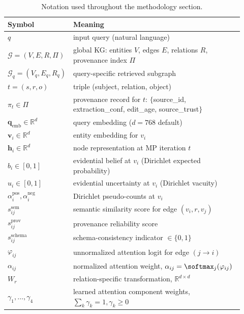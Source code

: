 
\begin{table}[t]
\centering
\caption{Notation used throughout the methodology section.}
\label{tab:notation}
\small
\begin{tabular}{@{}p{0.18\linewidth}p{0.74\linewidth}@{}}
\toprule
\textbf{Symbol} & \textbf{Meaning} \\
\midrule
$q$                 & input query (natural language) \\
$\mathcal{G}=(V,E,R,\Pi)$ & global KG: entities $V$, edges $E$, relations $R$, provenance index $\Pi$ \\
$\mathcal{G}_q=(V_q,E_q,R_q)$ & query-specific retrieved subgraph \\
$t = (s,r,o)$       & triple (subject, relation, object) \\
$\pi_t \in \Pi$     & provenance record for $t$: $\{$source\_id, extraction\_conf, edit\_age, source\_trust$\}$ \\
$\mathbf{q}_{\text{emb}} \in \mathbb{R}^d$ & query embedding ($d=768$ default) \\
$\mathbf{v}_i \in \mathbb{R}^d$    & entity embedding for $v_i$ \\
$\mathbf{h}_i \in \mathbb{R}^d$    & node representation at MP iteration $t$ \\
$b_i \in [0,1]$     & evidential belief at $v_i$ (Dirichlet expected probability) \\
$u_i \in [0,1]$     & evidential uncertainty at $v_i$ (Dirichlet vacuity) \\
$\alpha_i^{\text{pos}}, \alpha_i^{\text{neg}}$ & Dirichlet pseudo-counts at $v_i$ \\
$s^{\text{sem}}_{ij}$    & semantic similarity score for edge $(v_i, r, v_j)$ \\
$s^{\text{prov}}_{ij}$   & provenance reliability score \\
$s^{\text{schema}}_{ij}$ & schema-consistency indicator $\in \{0,1\}$ \\
$\varphi_{ij}$      & unnormalized attention logit for edge $(j{\rightarrow}i)$ \\
$\alpha_{ij}$       & normalized attention weight, $\alpha_{ij}=\softmax_j(\varphi_{ij})$ \\
$W_r$               & relation-specific transformation, $\mathbb{R}^{d\times d}$ \\
$\gamma_1,\dots,\gamma_4$ & learned attention component weights, $\sum_k\gamma_k=1, \gamma_k\geq0$ \\

\end{tabular}
\end{table}
